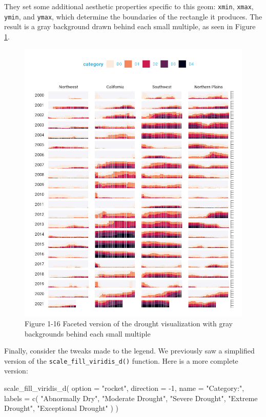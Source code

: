 \documentclass[
]{book}
\newenvironment{Shaded}{\begin{snugshade}}{\end{snugshade}}
\newcommand{\AttributeTok}[1]{\textcolor[rgb]{0.77,0.63,0.00}{#1}}
\newcommand{\DecValTok}[1]{\textcolor[rgb]{0.00,0.00,0.81}{#1}}
\newcommand{\FunctionTok}[1]{\textcolor[rgb]{0.00,0.00,0.00}{#1}}
\newcommand{\NormalTok}[1]{#1}
\newcommand{\SpecialCharTok}[1]{\textcolor[rgb]{0.00,0.00,0.00}{#1}}
\newcommand{\StringTok}[1]{\textcolor[rgb]{0.31,0.60,0.02}{#1}}
\begin{document}
They set some additional aesthetic properties specific to this geom: \texttt{xmin}, \texttt{xmax}, \texttt{ymin}, and \texttt{ymax}, which determine the boundaries of the rectangle it produces. The result is a gray background drawn behind each small multiple, as seen in Figure \ref{fig:drought-viz-theme-tweaks-plot}.

\begin{figure}
\includegraphics[width=1\linewidth]{data-viz_files/figure-latex/drought-viz-theme-tweaks-plot-1} \caption{Figure 1-16   Faceted version of the drought visualization with gray backgrounds behind each small multiple}\label{fig:drought-viz-theme-tweaks-plot}
\end{figure}

Finally, consider the tweaks made to the legend. We previously saw a simplified version of the \texttt{scale\_fill\_viridis\_d()} function. Here is a more complete version:

\begin{Shaded}
\begin{Highlighting}[]
\FunctionTok{scale\_fill\_viridis\_d}\NormalTok{(}
  \AttributeTok{option =} \StringTok{"rocket"}\NormalTok{,}
  \AttributeTok{direction =} \SpecialCharTok{{-}}\DecValTok{1}\NormalTok{,}
  \AttributeTok{name =} \StringTok{"Category:"}\NormalTok{,}
  \AttributeTok{labels =} \FunctionTok{c}\NormalTok{(}
    \StringTok{"Abnormally Dry"}\NormalTok{,}
    \StringTok{"Moderate Drought"}\NormalTok{,}
    \StringTok{"Severe Drought"}\NormalTok{,}
    \StringTok{"Extreme Drought"}\NormalTok{,}
    \StringTok{"Exceptional Drought"}
\NormalTok{  )}
\NormalTok{)}
\end{Highlighting}
\end{Shaded}
\end{document}
